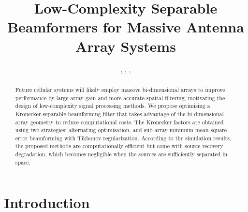 \documentclass{cta-author}
\begin{document}

\title{Low-Complexity Separable Beamformers for Massive Antenna Array Systems}

\author{, , , }

\address{
}


\begin{abstract}
	
	Future cellular systems will likely employ massive bi-dimensional arrays to improve performance by large array gain and more accurate spatial filtering, motivating the design of low-complexity signal processing methods. We propose optimising a Kronecker-separable beamforming filter that takes advantage of the bi-dimensional array geometry to reduce computational costs. The Kronecker factors are obtained using two strategies: alternating optimisation, and sub-array minimum mean square error beamforming with Tikhonov regularization. According to the simulation results, the proposed methods are computationally efficient but come with source recovery degradation, which becomes negligible when the sources are sufficiently separated in space.
	
\end{abstract}

\maketitle

\section{Introduction}
\end{document}
